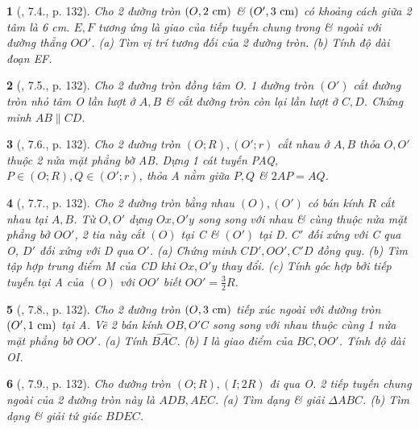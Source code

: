\documentclass{article}
\newtheorem{baitoan}{}
\begin{document}
\begin{baitoan}[\cite{Binh_boi_duong_Toan_9_tap_1}, 7.4., p. 132]
	Cho 2 đường tròn $(O,2\ {\rm cm})$ \& $(O',3\ {\rm cm})$ có khoảng cách giữa 2 tâm là {\rm6 cm}. $E,F$ tương ứng là giao của tiếp tuyến chung trong \& ngoài với đường thẳng $OO'$. (a) Tìm vị trí tương đối của 2 đường tròn. (b) Tính độ dài đoạn EF.
\end{baitoan}

\begin{baitoan}[\cite{Binh_boi_duong_Toan_9_tap_1}, 7.5., p. 132]
	Cho 2 đường tròn đồng tâm O. 1 đường tròn $(O')$ cắt đường tròn nhỏ tâm O lần lượt ở $A,B$ \& cắt đường tròn còn lại lần lượt ở $C,D$. Chứng minh $AB\parallel CD$.
\end{baitoan}

\begin{baitoan}[\cite{Binh_boi_duong_Toan_9_tap_1}, 7.6., p. 132]
	Cho 2 đường tròn $(O;R),(O';r)$ cắt nhau ở $A,B$ thỏa $O,O'$ thuộc 2 nửa mặt phẳng bờ AB. Dựng 1 cát tuyến PAQ, $P\in(O;R),Q\in(O';r)$, thỏa A nằm giữa $P,Q$ \& $2AP = AQ$.
\end{baitoan}

\begin{baitoan}[\cite{Binh_boi_duong_Toan_9_tap_1}, 7.7., p. 132]
	Cho 2 đường tròn bằng nhau $(O),(O')$ có bán kính $R$ cắt nhau tại $A,B$. Từ $O,O'$ dựng $Ox,O'y$ song song với nhau \& cùng thuộc nửa mặt phẳng bở $OO'$, 2 tia này cắt $(O)$ tại C \& $(O')$ tại D. $C'$ đối xứng với C qua O, $D'$ đối xứng với D qua $O'$. (a) Chứng minh $CD',OO',C'D$ đồng quy. (b) Tìm tập hợp trung điểm M của CD khi $Ox,O'y$ thay đổi. (c) Tính góc hợp bởi tiếp tuyến tại A của $(O)$ với $OO'$ biết $OO' = \frac{3}{2}R$.
\end{baitoan}

\begin{baitoan}[\cite{Binh_boi_duong_Toan_9_tap_1}, 7.8., p. 132]
	Cho 2 đường tròn $(O,3\ {\rm cm})$ tiếp xúc ngoài với đường tròn $(O',1\ {\rm cm})$ tại A. Vẽ 2 bán kính $OB,O'C$ song song với nhau thuộc cùng 1 nửa mặt phẳng bờ $OO'$. (a) Tính $\widehat{BAC}$. (b) I là giao điểm của $BC,OO'$. Tính độ dài OI.
\end{baitoan}

\begin{baitoan}[\cite{Binh_boi_duong_Toan_9_tap_1}, 7.9., p. 132]
	Cho đường tròn $(O;R),(I;2R)$ đi qua O. 2 tiếp tuyến chung ngoài của 2 đường tròn này là $ADB,AEC$. (a) Tìm dạng \& giải $\Delta ABC$. (b) Tìm dạng \& giải tứ giác $BDEC$.
\end{baitoan}
\end{document}

